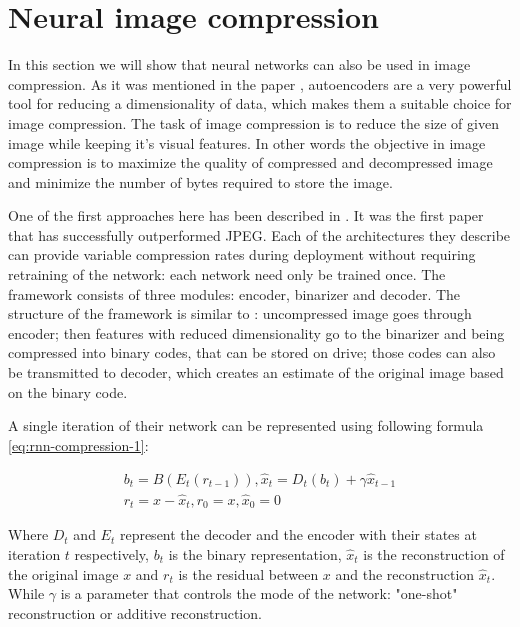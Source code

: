 \section{Neural image compression}

In this section we will show that neural networks can also be used in image compression. As it was mentioned in the paper \cite{Autoencoder_2006}, autoencoders are a very powerful tool for reducing a dimensionality of data, which makes them a suitable choice for image compression. The task of image compression is to reduce the size of given image while keeping it's visual features. In other words the objective in image compression is to maximize the quality of compressed and decompressed image and minimize the number of bytes required to store the image.

One of the first approaches here has been described in \cite{Toderici_Vincent_Johnston_Hwang_Minnen_Shor_Covell_2017}. It was the first paper that has successfully outperformed JPEG. Each of the architectures they describe can provide variable compression rates during deployment without requiring retraining of the network: each network need only be trained once. The framework consists of three modules: encoder, binarizer and decoder. The structure of the framework is similar to \cite{Autoencoder_2006}: uncompressed image goes through encoder; then features with reduced dimensionality go to the binarizer and being compressed into binary codes, that can be stored on drive; those codes can also be transmitted to decoder, which creates an estimate of the original image based on the binary code.

A single iteration of their network can be represented using following formula \ref{eq:rnn-compression-1}:

\begin{equation}
    \label{eq:rnn-compression-1}
    \begin{split}
        b_t = B(E_t(r_{t-1})), \hat{x}_t = D_t(b_t) + \gamma \hat{x}_{t-1} \\
        r_t = x - \hat{x}_t, r_0 = x, \hat{x}_0 = 0
    \end{split}
\end{equation}

Where $D_t$ and $E_t$ represent the decoder and the encoder with their states at iteration $t$ respectively, $b_t$ is the binary representation, $\hat{x}_t$ is the reconstruction of the original image $x$ and $r_t$ is the residual between $x$ and the reconstruction $\hat{x}_t$. While $\gamma$ is a parameter that controls the mode of the network: "one-shot" reconstruction or additive reconstruction.

